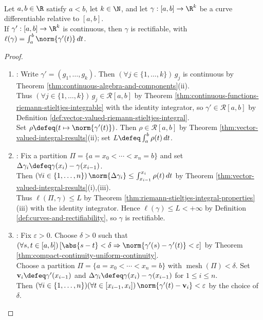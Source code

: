 \begin{theorem} \label{thm:continuously-differentiable-curves-rectifiable} \\
Let $a,b\in\R$ satisfy $a<b$, let $k\in\N$, and let $\gamma:[a,b]\to\R^k$ be a curve differentiable relative to $[a,b]$.\\
If $\gamma':[a,b]\to\R^k$ is continuous, then $\gamma$ is rectifiable, with $\ell(\gamma)=\int_a^b\norm{\gamma'(t)}\,dt$.
\begin{proof}
\begin{enumerate}[label=(\roman*)]
\setlength{\itemsep}{0pt}
\item {}: Write $\gamma'=(g_1,\ldots,g_k)$. Then $(\forall j\in\{1,\ldots,k\})\,g_j$ is continuous by Theorem \ref{thm:continuous-algebra-and-components}(ii).\\
Thus $(\forall j\in\{1,\ldots,k\})\,g_j\in\mathcal{R}[a,b]$ by Theorem \ref{thm:continuous-functions-riemann-stieltjes-integrable} with the identity integrator, so $\gamma'\in\mathcal{R}[a,b]$ by Definition \ref{def:vector-valued-riemann-stieltjes-integral}.\\
Set $\rho\defeq(t\mapsto\norm{\gamma'(t)})$. Then $\rho\in\mathcal{R}[a,b]$ by Theorem \ref{thm:vector-valued-integral-results}(ii); set $L\defeq\int_a^b\rho(t)\,dt$.
\item {}: Fix a partition $\Pi=\{a=x_0<\cdots<x_n=b\}$ and set $\Delta\gamma_i\defeq\gamma(x_i)-\gamma(x_{i-1})$.\\
Then $(\forall i\in\{1,\ldots,n\})\,\norm{\Delta\gamma_i}\leq\int_{x_{i-1}}^{x_i}\rho(t)\,dt$ by Theorem \ref{thm:vector-valued-integral-results}(i),(iii).\\
Thus $\ell(\Pi,\gamma)\leq L$ by Theorem \ref{thm:riemann-stieltjes-integral-properties}(iii) with the identity integrator. Hence $\ell(\gamma)\leq L<+\infty$ by Definition \ref{def:curves-and-rectifiability}, so $\gamma$ is rectifiable.
\item {}: Fix $\varepsilon>0$. Choose $\delta>0$ such that $(\forall s,t\in[a,b])\,[\abs{s-t}<\delta\Rightarrow\norm{\gamma'(s)-\gamma'(t)}<\varepsilon]$ by Theorem \ref{thm:compact-continuity-uniform-continuity}.\\
Choose a partition $\Pi=\{a=x_0<\cdots<x_n=b\}$ with $\operatorname{mesh}(\Pi)<\delta$. Set $\mathbf{v}_i\defeq\gamma'(x_{i-1})$ and $\Delta\gamma_i\defeq\gamma(x_i)-\gamma(x_{i-1})$ for $1\leq i\leq n$.\\
Then $(\forall i\in\{1,\ldots,n\})(\forall t\in[x_{i-1},x_i])\,\norm{\gamma'(t)-\mathbf{v}_i}<\varepsilon$ by the choice of $\delta$.\\

\end{enumerate}
\end{proof}
\end{theorem}
